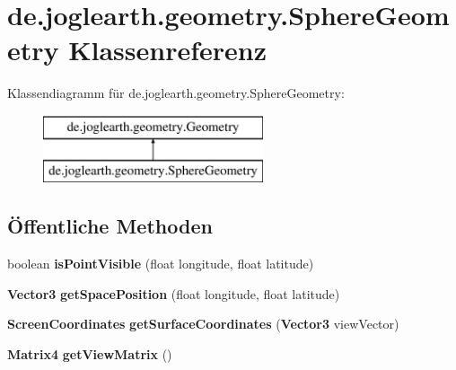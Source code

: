 \section{de.\-joglearth.\-geometry.\-Sphere\-Geometry Klassenreferenz}
\label{classde_1_1joglearth_1_1geometry_1_1_sphere_geometry}
Klassendiagramm für de.\-joglearth.\-geometry.\-Sphere\-Geometry\-:\begin{figure}[H]
\begin{center}
\leavevmode
\includegraphics[height=2.000000cm]{classde_1_1joglearth_1_1geometry_1_1_sphere_geometry}
\end{center}
\end{figure}
\subsection*{Öffentliche Methoden}
\begin{DoxyCompactItemize}
\item 
boolean {\bfseries is\-Point\-Visible} (float longitude, float latitude)\label{classde_1_1joglearth_1_1geometry_1_1_sphere_geometry_aa3c89f18a62d1ff65f66836f830987e2}

\item 
{\bf Vector3} {\bfseries get\-Space\-Position} (float longitude, float latitude)\label{classde_1_1joglearth_1_1geometry_1_1_sphere_geometry_af3f29a11beed52787c3f2e0bd12706d9}

\item 
{\bf Screen\-Coordinates} {\bfseries get\-Surface\-Coordinates} ({\bf Vector3} view\-Vector)\label{classde_1_1joglearth_1_1geometry_1_1_sphere_geometry_a59b8d62f478dde615bb2794e46fb64a7}

\item 
{\bf Matrix4} {\bfseries get\-View\-Matrix} ()\label{classde_1_1joglearth_1_1geometry_1_1_sphere_geometry_adaebcd9cc9c9e5c6146dd699c701cdba}

\end{DoxyCompactItemize}
